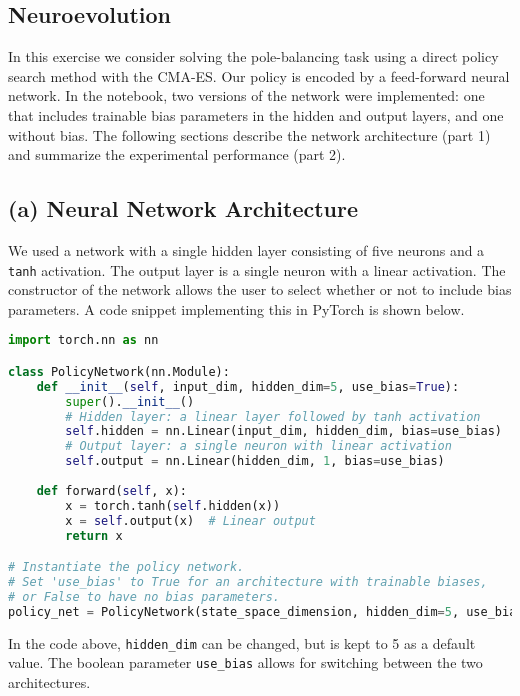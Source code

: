 \subsection{Neuroevolution}

In this exercise we consider solving the pole-balancing task using a direct policy search method with the CMA-ES. Our policy is encoded by a feed-forward neural network. In the notebook, two versions of the network were implemented: one that includes trainable bias parameters in the hidden and output layers, and one without bias. The following sections describe the network architecture (part 1) and summarize the experimental performance (part 2).

\subsection*{(a) Neural Network Architecture}
We used a network with a single hidden layer consisting of five neurons and a \texttt{tanh} activation. The output layer is a single neuron with a linear activation. The constructor of the network allows the user to select whether or not to include bias parameters. A code snippet implementing this in PyTorch is shown below.

\begin{lstlisting}[language=Python, caption={Definition of the policy network.}, basicstyle=\ttfamily\small]
import torch.nn as nn

class PolicyNetwork(nn.Module):
    def __init__(self, input_dim, hidden_dim=5, use_bias=True):
        super().__init__()
        # Hidden layer: a linear layer followed by tanh activation
        self.hidden = nn.Linear(input_dim, hidden_dim, bias=use_bias)
        # Output layer: a single neuron with linear activation
        self.output = nn.Linear(hidden_dim, 1, bias=use_bias)
        
    def forward(self, x):
        x = torch.tanh(self.hidden(x))
        x = self.output(x)  # Linear output
        return x

# Instantiate the policy network.
# Set 'use_bias' to True for an architecture with trainable biases,
# or False to have no bias parameters.
policy_net = PolicyNetwork(state_space_dimension, hidden_dim=5, use_bias=True)
\end{lstlisting}

In the code above, \texttt{hidden\_dim} can be changed, but is kept to 5 as a default value. The boolean parameter \texttt{use\_bias} allows for switching between the two architectures.

